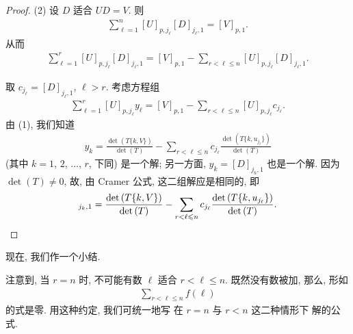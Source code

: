 \begin{proof}
    (2)
    设 \(D\) 适合 \(UD = V\).
    则
    \begin{align*}
        \sum_{\ell = 1}^{n}
        {[U]_{p,j_\ell} [D]_{j_\ell,1}}
            = [V]_{p,1}.
    \end{align*}
    从而
    \begin{align*}
        \sum_{\ell = 1}^{r}
        {[U]_{p,j_\ell} [D]_{j_\ell,1}}
            = [V]_{p,1}
        - \sum_{r < \ell \leq n}
        {[U]_{p,j_\ell} [D]_{j_\ell,1}}.
    \end{align*}

    取 \(c_{j_\ell} = [D]_{j_\ell,1}\),
    \(\ell > r\).
    考虑方程组
    \begin{align*}
        \sum_{\ell = 1}^{r}
        {[U]_{p,j_\ell} y_\ell}
        = [V]_{p,1}
        - \sum_{r < \ell \leq n}
        {[U]_{p,j_\ell} c_{j_\ell}}.
    \end{align*}
    由 (1), 我们知道
    \begin{align*}
        y_k =
        \frac{\det {(T\{k,V\})}}{\det {(T)}}
        - \sum_{r < \ell \leq n}
        {c_{j_\ell}
        \frac{\det {(T\{k,u_{j_\ell}\})}}{\det {(T)}}}
    \end{align*}
    (其中 \(k = 1\), \(2\), \(\dots\), \(r\), 下同)
    是一个解;
    另一方面,
    \(y_k = [D]_{j_k,1}\) 也是一个解.
    因为 \(\det {(T)} \neq 0\),
    故, 由 Cramer 公式,
    这二组解应是相同的,
    即
    \begin{equation*}
        [D]_{j_k,1} =
        \frac{\det {(T\{k,V\})}}{\det {(T)}}
        - \sum_{r < \ell \leq n}
        {c_{j_\ell}
        \frac{\det {(T\{k,u_{j_\ell}\})}}{\det {(T)}}}.
        \qedhere
    \end{equation*}
\end{proof}

现在, 我们作一个小结.

注意到, 当 \(r = n\) 时,
不可能有数 \(\ell\) 适合 \(r < \ell \leq n\).
既然没有数被加, 那么, 形如
\begin{align*}
    \sum_{r < \ell \leq n} {f(\ell)}
\end{align*}
的式是零.
用这种约定,
我们可统一地写%
在 \(r = n\) 与 \(r < n\) 这二种情形下%
解的公式.

